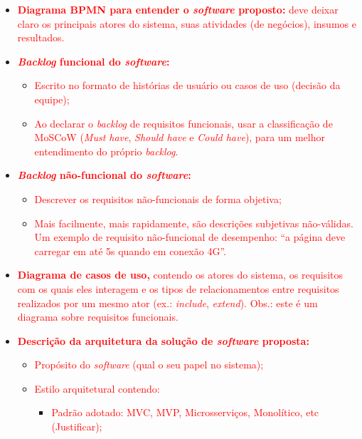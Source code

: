 \begin{itemize}
    \item \textcolor{red}{ \textbf{Diagrama BPMN para entender o \textit{software} proposto:} deve deixar claro os principais atores do sistema, suas atividades (de negócios), insumos e resultados.}
    \item \textcolor{red}{\textbf{\textit{Backlog} funcional do \textit{software}:}}
    \begin{itemize}
        \item \textcolor{red}{ Escrito no formato de histórias de usuário ou casos de uso (decisão da equipe);}
        \item \textcolor{red}{ Ao declarar o \textit{backlog} de requisitos funcionais, usar a  classificação de MoSCoW (\textit{Must have}, \textit{Should have} e \textit{Could have}),  para um melhor entendimento do próprio \textit{backlog}.}
    \end{itemize}
    \item \textcolor{red}{\textbf{ \textit{Backlog} não-funcional do \textit{software}:}}
    \begin{itemize}
        \item \textcolor{red}{ Descrever os requisitos não-funcionais de forma objetiva;}
        \item \textcolor{red}{ Mais facilmente, mais rapidamente, são descrições subjetivas não-válidas. Um exemplo de requisito não-funcional de desempenho: ``a página deve carregar em até 5s quando em conexão 4G''. }
    \end{itemize}
    \item \textcolor{red}{ \textbf{Diagrama de casos de uso,} contendo os atores do sistema, os requisitos com os quais eles interagem e os tipos de relacionamentos entre requisitos realizados por um mesmo ator (ex.: \textit{include}, \textit{extend}). Obs.: este é um diagrama sobre requisitos funcionais.}
    \item \textcolor{red}{ \textbf{Descrição da arquitetura da solução de \textit{software} proposta:}}
    \begin{itemize}
        \item \textcolor{red}{ Propósito do \textit{software} (qual o seu papel no sistema);}
        \item \textcolor{red}{ Estilo arquitetural contendo:}
        \begin{itemize}
            \item \textcolor{red}{ Padrão adotado: MVC, MVP, Microsserviços, Monolítico, etc (Justificar);}

\end{itemize}
\end{itemize}
\end{itemize}
